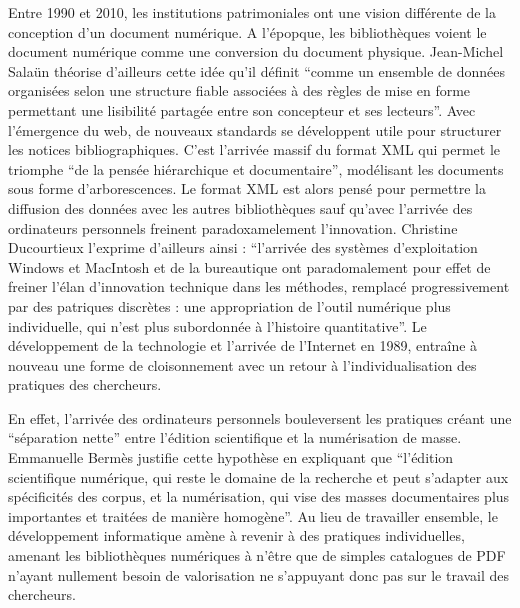Entre 1990 et 2010, les institutions patrimoniales ont une vision différente de la conception d'un document numérique. A l'épopque, les bibliothèques voient le document numérique comme une conversion du document physique. Jean-Michel Salaün théorise d'ailleurs cette idée qu'il définit \enquote{comme un ensemble de données organisées selon une structure fiable associées à des règles de mise en forme permettant une lisibilité partagée entre son concepteur et ses lecteurs}. Avec l'émergence du web, de nouveaux standards se développent utile pour structurer les notices bibliographiques. C'est l'arrivée massif du format XML qui permet le triomphe \enquote{de la pensée hiérarchique et documentaire}, modélisant les documents sous forme d'arborescences. Le format XML est alors pensé pour permettre la diffusion des données avec les autres bibliothèques sauf qu'avec l'arrivée des ordinateurs personnels freinent paradoxamelement l'innovation. Christine Ducourtieux l'exprime d'ailleurs ainsi : \enquote{l'arrivée des systèmes d'exploitation Windows et MacIntosh et de la bureautique ont paradomalement pour effet de freiner l'élan d'innovation technique dans les méthodes, remplacé progressivement par des patriques discrètes : une appropriation de l'outil numérique plus individuelle, qui n'est plus subordonnée à l'histoire quantitative}. Le développement de la technologie et l'arrivée de l'Internet en 1989, entraîne à nouveau une forme de cloisonnement avec un retour à l'individualisation des pratiques des chercheurs. 

En effet, l'arrivée des ordinateurs personnels bouleversent les pratiques créant une \enquote{séparation nette} entre l'édition scientifique et la numérisation de masse. Emmanuelle Bermès justifie cette hypothèse en expliquant que \enquote{l'édition scientifique numérique, qui reste le domaine de la recherche et peut s'adapter aux spécificités des corpus, et la numérisation, qui vise des masses documentaires plus importantes et traitées de manière homogène}. Au lieu de travailler ensemble, le développement informatique amène à revenir à des pratiques individuelles, amenant les bibliothèques numériques à n'être que de simples catalogues de PDF n'ayant nullement besoin de valorisation ne s'appuyant donc pas sur le travail des chercheurs. 

